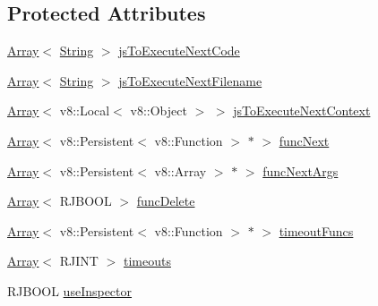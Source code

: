 \subsection*{Protected Attributes}
\begin{DoxyCompactItemize}
\item 
\mbox{\hyperlink{class_rad_j_a_v_1_1_array}{Array}}$<$ \mbox{\hyperlink{class_rad_j_a_v_1_1_string}{String}} $>$ \mbox{\hyperlink{class_rad_j_a_v_1_1_v8_javascript_engine_aee56cac86a4df71bf44c8bf4df05ab0f}{js\+To\+Execute\+Next\+Code}}
\item 
\mbox{\hyperlink{class_rad_j_a_v_1_1_array}{Array}}$<$ \mbox{\hyperlink{class_rad_j_a_v_1_1_string}{String}} $>$ \mbox{\hyperlink{class_rad_j_a_v_1_1_v8_javascript_engine_a7ad75e0d7bc5d1f2710c0b5ce82c6fa8}{js\+To\+Execute\+Next\+Filename}}
\item 
\mbox{\hyperlink{class_rad_j_a_v_1_1_array}{Array}}$<$ v8\+::\+Local$<$ v8\+::\+Object $>$ $>$ \mbox{\hyperlink{class_rad_j_a_v_1_1_v8_javascript_engine_a4f4ed922cbd92c5271639bfb6c86f5e0}{js\+To\+Execute\+Next\+Context}}
\item 
\mbox{\hyperlink{class_rad_j_a_v_1_1_array}{Array}}$<$ v8\+::\+Persistent$<$ v8\+::\+Function $>$ $\ast$ $>$ \mbox{\hyperlink{class_rad_j_a_v_1_1_v8_javascript_engine_a4f0245214c2db2b326d17682797f1f63}{func\+Next}}
\item 
\mbox{\hyperlink{class_rad_j_a_v_1_1_array}{Array}}$<$ v8\+::\+Persistent$<$ v8\+::\+Array $>$ $\ast$ $>$ \mbox{\hyperlink{class_rad_j_a_v_1_1_v8_javascript_engine_a27673918aa575066824d56c9d033bac2}{func\+Next\+Args}}
\item 
\mbox{\hyperlink{class_rad_j_a_v_1_1_array}{Array}}$<$ R\+J\+B\+O\+OL $>$ \mbox{\hyperlink{class_rad_j_a_v_1_1_v8_javascript_engine_a5aff3b1ae19e0782040c87f5205e0574}{func\+Delete}}
\item 
\mbox{\hyperlink{class_rad_j_a_v_1_1_array}{Array}}$<$ v8\+::\+Persistent$<$ v8\+::\+Function $>$ $\ast$ $>$ \mbox{\hyperlink{class_rad_j_a_v_1_1_v8_javascript_engine_a2cee06b34099a70d6efff924d81baf9d}{timeout\+Funcs}}
\item 
\mbox{\hyperlink{class_rad_j_a_v_1_1_array}{Array}}$<$ R\+J\+I\+NT $>$ \mbox{\hyperlink{class_rad_j_a_v_1_1_v8_javascript_engine_aedaa033cba92c65a288c3135a2dbe3f8}{timeouts}}
\item 
R\+J\+B\+O\+OL \mbox{\hyperlink{class_rad_j_a_v_1_1_v8_javascript_engine_a4810bdb10c5af9225f69ec2b7d8bb699}{use\+Inspector}}
\end{DoxyCompactItemize}


